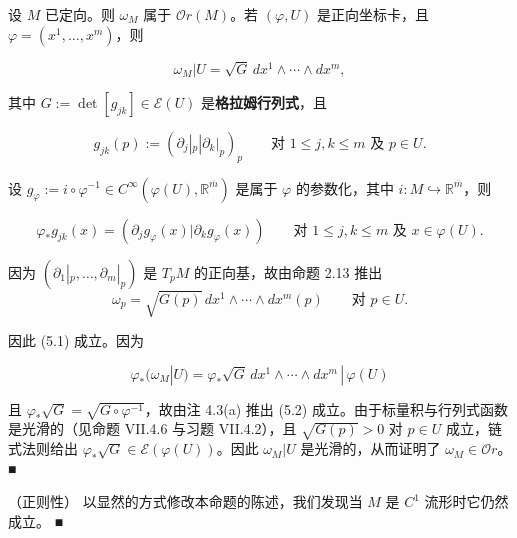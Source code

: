 \begin{proposition}

设 $ M $ 已定向。则 $ \omega_M $ 属于 $ \mathcal{O}r(M) $。若 $ (\varphi, U) $ 是正向坐标卡，且 $ \varphi = (x^1, \ldots, x^m) $，则

\begin{equation}
\omega_M|U = \sqrt{G}\, dx^1 \wedge \cdots \wedge dx^m ,\tag{5.1}
\end{equation}

其中 $ G := \det[g_{jk}] \in \mathcal{E}(U) $ 是\textbf{格拉姆行列式}，且

\[
g_{jk}(p) := (\partial_j|_p | \partial_k|_p)_p \qquad \text{对 } 1 \le j, k \le m \text{ 及 } p \in U .
\]

设 $ g_\varphi := i \circ \varphi^{-1} \in C^\infty(\varphi(U), \mathbb{R}^{\overline{m}}) $ 是属于 $ \varphi $ 的参数化，其中 $ i : M \hookrightarrow \mathbb{R}^{\overline{m}} $，则

\begin{equation}
\varphi_{*}g_{jk}(x) = (\partial_j g_\varphi(x) | \partial_k g_\varphi(x)) \qquad \text{对 } 1 \le j, k \le m \text{ 及 } x \in \varphi(U) .\tag{5.2}
\end{equation}

\proofhead
因为 $ (\partial_1|_p, \ldots, \partial_m|_p) $ 是 $ T_p M $ 的正向基，故由命题 2.13 推出
\[
\omega_p = \sqrt{G(p)}\, dx^1 \wedge \cdots \wedge dx^m(p) \qquad \text{对 } p \in U .
\]

因此 (5.1) 成立。因为

\[
\varphi_{*}(\omega_M|U) = \varphi_{*}\sqrt{G}\, dx^1 \wedge \cdots \wedge dx^m \,|\, \varphi(U)
\]

且 $ \varphi_{*}\sqrt{G} = \sqrt{G \circ \varphi^{-1}} $，故由注 4.3(a) 推出 (5.2) 成立。由于标量积与行列式函数是光滑的（见命题 VII.4.6 与习题 VII.4.2），且 $ \sqrt{G(p)} > 0 $ 对 $ p \in U $ 成立，链式法则给出 $ \varphi_{*}\sqrt{G} \in \mathcal{E}(\varphi(U)) $。因此 $ \omega_M|U $ 是光滑的，从而证明了 $ \omega_M \in \mathcal{O}r $。 \nobreak\hspace{0.35em}■

\end{proposition}

\begin{remark}

（正则性） 以显然的方式修改本命题的陈述，我们发现当 $ M $ 是 $ C^1 $ 流形时它仍然成立。 \nobreak\hspace{0.35em}■

\end{remark}

